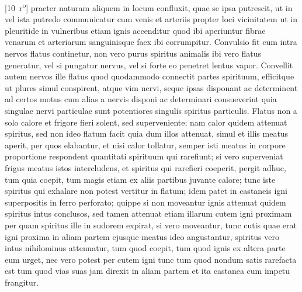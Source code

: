 [10~r\textsuperscript{o}]
praeter naturam aliquem in locum confluxit, quae
se ipsa putrescit, ut in 
vel ista putredo communicatur cum venis et arteriis propter loci vicinitatem ut in pleuritide in vulneribus etiam ignis accenditur quod ibi aperiuntur fibrae venarum et arteriarum sanguinisque faex ibi corrumpitur. Convulsio fit cum intra nervos flatus continetur, non vero purus spiritus animalis ibi vero flatus generatur, vel si pungatur nervus, vel si forte eo penetret lentus vapor. Convellit autem nervos ille flatus quod quodammodo connectit partes spirituum, efficitque ut plures simul conspirent, atque
vim nervi, seque ipsas disponant ac determinent ad certos motus cum alias a nervis disponi ac determinari consueverint quia singulae nervi particulae sunt potentiores singulis spiritus particulis. Flatus non a solo calore et frigore fieri solent, sed
superveniente; nam calor quidem attenuat spiritus, sed non ideo flatum facit quia dum illos attenuat, simul et illis meatus aperit, per quos elabantur, et nisi calor tollatur, semper isti meatus in corpore proportione respondent quantitati spirituum qui rarefiunt; si vero superveniat frigus meatus istos intercludens, et spiritus qui rarefieri coeperit, pergit adhuc, tum quia coepit, tum magis etiam ex aliis partibus juvante calore; tunc iste spiritus qui exhalare non potest vertitur in flatum; idem patet in castaneis igni superpositis in ferro perforato; quippe si non moveantur ignis attenuat quidem spiritus intus conclusos, sed tamen attenuat etiam illarum cutem igni proximam per quam spiritus ille in sudorem expirat, si vero moveantur, tunc cutis quae erat igni proxima in aliam partem
 ejusque meatus ideo angustantur, spiritus vero intus nihilominus attenuatur, tum quod coepit, tum quod ignis ex altera parte eum urget, nec vero potest per cutem igni tunc
tum quod nondum satis rarefacta est tum quod vias suas jam direxit in aliam partem et ita castanea cum impetu frangitur.
